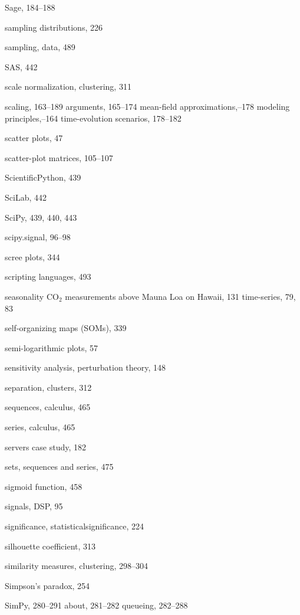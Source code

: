 \documentclass{Oreilly5980006}
\begin{document}
\begin{theindex}
  \item Sage, 184--188
  \item sampling distributions, 226
  \item sampling, data, 489
  \item SAS, 442
  \item scale normalization, clustering, 311
  \item scaling, 163--189
    \subitem arguments, 165--174
    \subitem mean-field approximations,--178
    \subitem modeling principles,--164
    \subitem time-evolution scenarios, 178--182
  \item scatter plots, 47
  \item scatter-plot matrices, 105--107
  \item ScientificPython, 439
  \item SciLab, 442
  \item SciPy, 439, 440, 443
  \item scipy.signal, 96--98
  \item scree plots, 344
  \item scripting languages, 493
  \item seasonality
    \subitem $\mathrm{CO_2}$ measurements above Mauna Loa on Hawaii, 
		131
    \subitem time-series, 79, 83
  \item self-organizing maps (SOMs), 339
  \item semi-logarithmic plots, 57
  \item sensitivity analysis, perturbation theory, 148
  \item separation, clusters, 312
  \item sequences, calculus, 465
  \item series, calculus, 465
  \item servers case study, 182
  \item sets, sequences and series, 475
  \item sigmoid function, 458
  \item signals, DSP, 95
  \item significance, statistical\break significance, 224
  \item silhouette coefficient, 313
  \item similarity measures, clustering, 298--304
  \item Simpson's paradox, 254
  \item SimPy, 280--291
    \subitem about, 281--282
    \subitem queueing, 282--288

\end{theindex}
\end{document}
